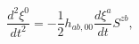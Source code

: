 \begin{equation}
\frac{d^{2}\xi^{0}}{dt^{2}}=-\frac{1}{2}h_{ab,00}\frac{d\xi^{a}}{dt}S^{zb},
\label{49}
\end{equation}

